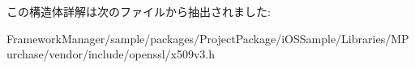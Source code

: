 この構造体詳解は次のファイルから抽出されました\+:\begin{DoxyCompactItemize}
\item 
Framework\+Manager/sample/packages/\+Project\+Package/i\+O\+S\+Sample/\+Libraries/\+M\+Purchase/vendor/include/openssl/x509v3.\+h\end{DoxyCompactItemize}
